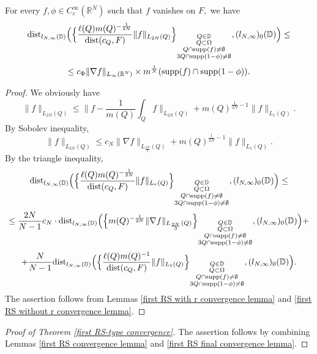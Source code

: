 \documentclass{amsart}
\begin{document}
\begin{lemma}\label{first RS final convergence lemma} For every $f,\phi\in C^{\infty}_c(\mathbb{R}^N)$ such that $f$ vanishes on $F,$ we have
$${\rm dist}_{l_{N,\infty}(\mathbb{D})}\Big(\Big\{\frac{\ell(Q)m(Q)^{-\frac1{2N}}}{{\rm dist}(c_Q,F)}\|f\|_{L_{2N}(Q)}\Big\}_{\substack{Q\in\mathbb{D}\\ Q\subset\Omega\\ Q\cap {\rm supp}(f)\neq\emptyset\\ 3Q\cap {\rm supp}(1-\phi)\neq\emptyset}},(l_{N,\infty})_0(\mathbb{D})\Big)\leq$$
$$\leq c_{\Phi}\|\nabla f\|_{L_{\infty}(\mathbb{R}^N)}\times m^{\frac1N}({\rm supp}(f)\cap{\rm supp}(1-\phi)).$$
\end{lemma}
\begin{proof} We obviously have
$$\|f\|_{L_{2N}(Q)}\leq\Big\|f-\frac1{m(Q)}\int_Qf\Big\|_{L_{2N}(Q)}+m(Q)^{\frac1{2N}-1}\|f\|_{L_1(Q)}.$$
By Sobolev inequality,
$$\|f\|_{L_{2N}(Q)}\leq c_N\|\nabla f\|_{L_{\frac{2N}{3}}(Q)}+m(Q)^{\frac1{2N}-1}\|f\|_{L_1(Q)}.$$
By the triangle inequality,
$${\rm dist}_{l_{N,\infty}(\mathbb{D})}\Big(\Big\{\frac{\ell(Q)m(Q)^{-\frac1{2N}}}{{\rm dist}(c_Q,F)}\|f\|_{L_r(Q)}\Big\}_{\substack{Q\in\mathbb{D}\\ Q\subset\Omega\\ Q\cap {\rm supp}(f)\neq\emptyset\\ 3Q\cap {\rm supp}(1-\phi)\neq\emptyset}},(l_{N,\infty})_0(\mathbb{D})\Big)\leq$$
$$\leq \frac{2N}{N-1}c_N\cdot {\rm dist}_{l_{N,\infty}(\mathbb{D})}\Big(\Big\{m(Q)^{-\frac1{2N}}\|\nabla f\|_{L_{\frac{2N}{3}}(Q)}\Big\}_{\substack{Q\in\mathbb{D}\\ Q\subset\Omega\\ Q\cap {\rm supp}(f)\neq\emptyset\\ 3Q\cap {\rm supp}(1-\phi)\neq\emptyset}},(l_{N,\infty})_0(\mathbb{D})\Big)+$$
$$+\frac{N}{N-1}{\rm dist}_{l_{N,\infty}(\mathbb{D})}\Big(\Big\{\frac{\ell(Q)m(Q)^{-1}}{{\rm dist}(c_Q,F)}\|f\|_{L_1(Q)}\Big\}_{\substack{Q\in\mathbb{D}\\ Q\subset\Omega\\ Q\cap {\rm supp}(f)\neq\emptyset\\ 3Q\cap {\rm supp}(1-\phi)\neq\emptyset}},(l_{N,\infty})_0(\mathbb{D})\Big).$$
The assertion follows from Lemmas \ref{first RS with r convergence lemma} and \ref{first RS without r convergence lemma}.
\end{proof}

\begin{proof}[Proof of Theorem \ref{first RS-type convergence}] The assertion follows by combining Lemmas \ref{first RS convergence lemma} and \ref{first RS final convergence lemma}.
\end{proof}
\end{document}
